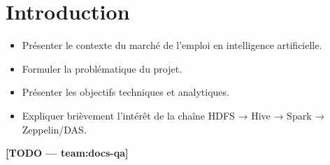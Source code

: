 \section{Introduction}
\begin{itemize}
  \item Présenter le contexte du marché de l'emploi en intelligence artificielle.
  \item Formuler la problématique du projet.
  \item Présenter les objectifs techniques et analytiques.
  \item Expliquer brièvement l'intérêt de la chaîne HDFS → Hive → Spark → Zeppelin/DAS.
\end{itemize}
\textbf{[TODO — team:docs-qa]}

